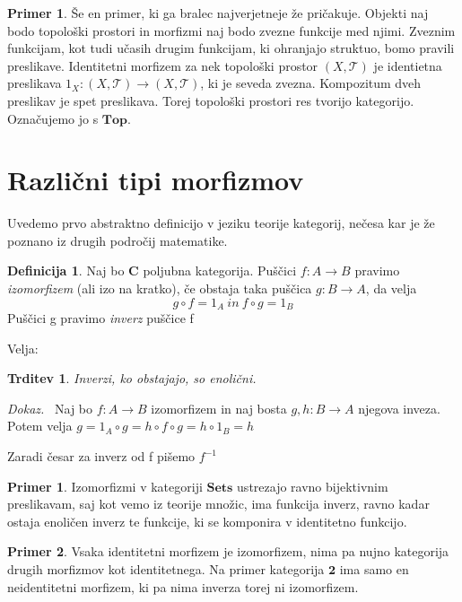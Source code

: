 \documentclass[12pt,a4paper]{book}
\theoremstyle{definition}
\newtheorem{definicija}{Definicija}[chapter]
\theoremstyle{plain}
\newtheorem{trditev}{Trditev}[izrek]
\newenvironment{dokaz}{\emph{Dokaz.}\ }{\hspace{\fill}{$\Box$}}
\theoremstyle{definition}
\newtheorem{primer}{Primer}[section]
\newtheorem*{primer*}{Primer}
\theoremstyle{remark}
\newcommand{\cat}[1]{\textbf{#1}}
\begin{document}
\begin{primer}
Še en primer, ki ga bralec najverjetneje že pričakuje. Objekti naj bodo topološki prostori in morfizmi naj bodo zvezne funkcije med njimi. Zveznim funkcijam, kot tudi učasih drugim funkcijam, ki ohranjajo struktuo, bomo pravili preslikave. Identitetni morfizem za nek topološki prostor $(X, \mathcal{T})$ je identietna preslikava $1_X : (X, \mathcal{T}) \to (X, \mathcal{T})$, ki je seveda zvezna. Kompozitum dveh preslikav je spet preslikava. Torej topološki prostori res tvorijo kategorijo. Označujemo jo s $\cat{Top}$.
\end{primer}

\section{Različni tipi morfizmov}
Uvedemo prvo abstraktno definicijo v jeziku teorije kategorij, nečesa kar je že poznano iz drugih področij matematike.

\begin{definicija} Naj bo \cat{C} poljubna kategorija. Puščici $f : A \to B$ pravimo \textit{izomorfizem} (ali izo na kratko), če obstaja taka puščica $g : B \to A$, da velja
$$g \circ f = 1_A \ in \ f \circ g = 1_B$$
Puščici g pravimo \textit{inverz} puščice f
\end{definicija}
Velja:

\begin{trditev} Inverzi, ko obstajajo, so enolični.
\end{trditev}
\begin{dokaz}
Naj bo $f : A \to B$ izomorfizem in naj bosta $g,h: B \to A$ njegova inveza. Potem velja $g = 1_A \circ g = h \circ f \circ g = h \circ 1_B = h$
\end{dokaz}

Zaradi česar za inverz od f pišemo $f^{-1}$

\begin{primer*}
Izomorfizmi v kategoriji $\cat{Sets}$ ustrezajo ravno bijektivnim preslikavam, saj kot vemo iz teorije množic, ima funkcija inverz, ravno kadar ostaja enoličen inverz te funkcije, ki se komponira v identitetno funkcijo. 
\end{primer*}

\begin{primer*}
Vsaka identitetni morfizem je izomorfizem, nima pa nujno kategorija drugih morfizmov kot identitetnega. Na primer kategorija $\cat{2}$ ima samo en neidentitetni morfizem, ki pa nima inverza torej ni izomorfizem.
\end{primer*}
\end{document}

